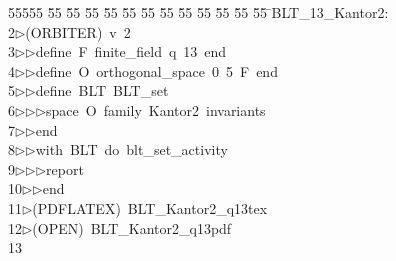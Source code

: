 %
%
\begin{tabbing}
55555 \= 55 \= 55 \= 55 \= 55 \= 55 \= 55 \= 55 \= 55 \= 55 \= 55 \= 55 \= 55 \= \>BLT\_13\_Kantor2:\\[0pt]
2\>$\triangleright$\>(ORBITER)\ v\ 2\ \\[0pt]
3\>$\triangleright$\>$\triangleright$\>define\ F\ finite\_field\ q\ 13\ end\ \\[0pt]
4\>$\triangleright$\>$\triangleright$\>define\ O\ orthogonal\_space\ 0\ 5\ F\ end\ \\[0pt]
5\>$\triangleright$\>$\triangleright$\>define\ BLT\ BLT\_set\ \\[0pt]
6\>$\triangleright$\>$\triangleright$\>$\triangleright$\>space\ O\ family\ Kantor2\ invariants\ \\[0pt]
7\>$\triangleright$\>$\triangleright$\>end\ \\[0pt]
8\>$\triangleright$\>$\triangleright$\>with\ BLT\ do\ blt\_set\_activity\ \\[0pt]
9\>$\triangleright$\>$\triangleright$\>$\triangleright$\>report\ \\[0pt]
10\>$\triangleright$\>$\triangleright$\>end\\[0pt]
11\>$\triangleright$\>(PDFLATEX)\ BLT\_Kantor2\_q13tex\\[0pt]
12\>$\triangleright$\>(OPEN)\ BLT\_Kantor2\_q13pdf\\[0pt]
13\>\end{tabbing}
